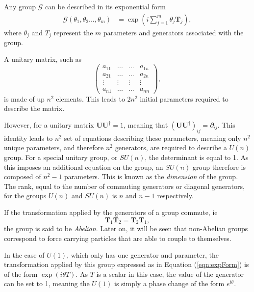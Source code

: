 \documentclass{article}
\begin{document}
Any group $\mathcal{G}$ can be described in its exponential form
\begin{equation}
\label{eqn:expForm}
\begin{split}
\mathcal{G}(\theta_1,\theta_2...,\theta_m) &= \exp(i\sum\limits_{j=1}^{m}\theta_j \bm{T}_j),
\end{split}
\end{equation}
where $\theta_j$ and $T_j$ represent the $m$ parameters and generators associated with the group.

A unitary matrix, such as
\begin{equation}
\label{matrix:unitary}
\left(
\begin{matrix}
    a_{11} & ... & ... & a_{1n} \\
    a_{21} & ... & ... & a_{2n} \\
    \vdots & \vdots & \vdots & \vdots \\
    a_{n1} & ... & ... & a_{nn}
\end{matrix}
\right),
\end{equation}
is made of up $n^2$ elements. This leads to $2n^2$ initial parameters required to describe the matrix.

However, for a unitary matrix $\bm{U}\bm{U}^{\dagger}=1$, meaning that $(\bm{U}\bm{U}^{\dagger})_{ij}=\partial_{ij}$. This identity leads to $n^2$ set of equations describing these parameters, meaning only $n^2$ unique parameters, and therefore $n^2$ generators, are required to describe a $U(n)$ group. For a special unitary group, or $SU(n)$, the determinant is equal to 1. As this imposes an additional equation on the group, an $SU(n)$ group therefore is composed of $n^2 - 1$ parameters. This is known as the \textit{dimension} of the group. The rank, equal to the number of commuting generators or diagonal generators, for the groups $U(n)$ and $SU(n)$ is $n$ and $n-1$ respectively.

If the transformation applied by the generators of a group commute, ie
\begin{equation}
\bm{T}_1\bm{T}_2 = \bm{T}_2\bm{T}_1,
\end{equation}
the group is said to be \textit{Abelian}. Later on, it will be seen that non-Abelian groups correspond to force carrying particles that are able to couple to themselves.

In the case of $U(1)$, which only has one generator and parameter, the transformation applied by this group expressed as in Equation (\ref{eqn:expForm}) is of the form $\exp(i\theta T)$. As $T$ is a scalar in this case, the value of the generator can be set to 1, meaning the $U(1)$ is simply a phase change of the form $e^{i\theta}$.
\end{document}
